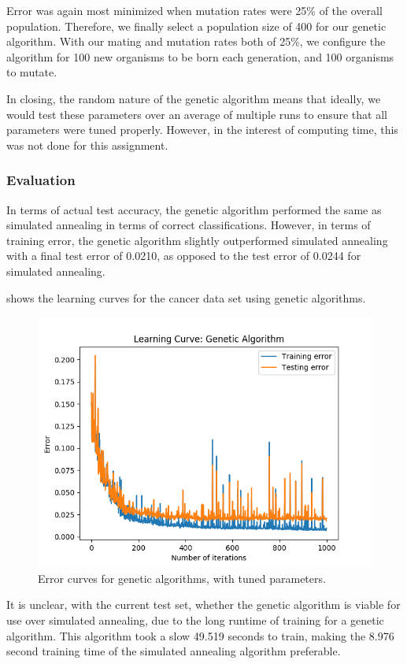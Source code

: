 \documentclass{article}
\begin{document}
        Error was again most minimized when mutation rates were 25\% of the overall population. Therefore, we finally select a population size of 400 for our genetic algorithm. With our mating and mutation rates both of 25\%, we configure the algorithm for 100 new organisms to be born each generation, and 100 organisms to mutate.

        In closing, the random nature of the genetic algorithm means that ideally, we would test these parameters over an average of multiple runs to ensure that all parameters were tuned properly. However, in the interest of computing time, this was not done for this assignment.

      \subsubsection{Evaluation}
        In terms of actual test accuracy, the genetic algorithm performed the same as simulated annealing in terms of correct classifications. However, in terms of training error, the genetic algorithm slightly outperformed simulated annealing with a final test error of 0.0210, as opposed to the test error of 0.0244 for simulated annealing.

         shows the learning curves for the cancer data set using genetic algorithms.

        \begin{figure}[htb]
        \centering
        \includegraphics[width=.5\linewidth]{out/plot/GA.png}
        \caption{Error curves for genetic algorithms, with tuned parameters.}
        \label{fig:ga-learning}
        \end{figure}

        It is unclear, with the current test set, whether the genetic algorithm is viable for use over simulated annealing, due to the long runtime of training for a genetic algorithm. This algorithm took a slow 49.519 seconds to train, making the 8.976 second training time of the simulated annealing algorithm preferable.
\end{document}
